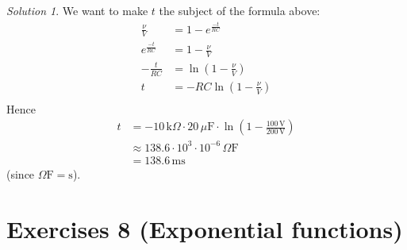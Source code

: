 \documentclass[
  12pt,
  oneside]{book}
\theoremstyle{definition}
\theoremstyle{definition}
\theoremstyle{definition}
\theoremstyle{definition}
\theoremstyle{remark}
\newtheorem*{solution}{Solution}
\begin{document}
\begin{solution}
We want to make \(t\) the subject of the formula above:
\begin{align*}
\frac{\nu}{V} &=1-e^{\frac{-t}{RC}}\\
e^{\frac{-t}{RC}} &= 1-\frac{\nu}{V}\\
-\frac{t}{RC} &= \ln\left(1-\frac{\nu}{V}\right)\\
t &= -RC\ln\left(1-\frac{\nu}{V}\right)\\
\end{align*}
Hence
\begin{align*}
t&=-10\,\mathrm{k}\Omega\cdot 20\,\mu\mathrm{F}\cdot \ln\left(1-\frac{100\,\mathrm{V}}{200\,\mathrm{V}}\right)\\
&\approx 138.6\cdot 10^3\cdot 10^{-6} \,\Omega\mathrm{F}\\
&= 138.6 \,\mathrm{ms}
\end{align*}
(since \(\Omega\mathrm{F} = \mathrm{s}\)).
\end{solution}

\hypertarget{exercises-8-exponential-functions}{%
\chapter*{Exercises 8 (Exponential functions)}\label{exercises-8-exponential-functions}}
\end{document}
